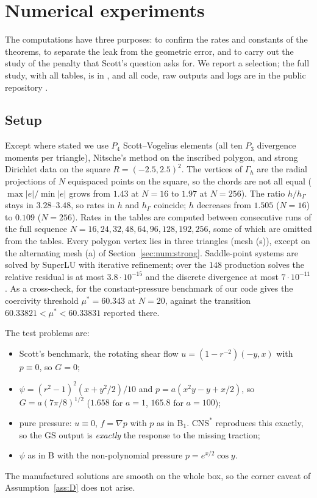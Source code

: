 \documentclass[pdflatex,sn-mathphys-num]{sn-jnl}
\theoremstyle{thmstyleone}
\theoremstyle{thmstylethree}
\newcommand{\hG}{h_\Gamma}
\newcommand{\Gh}{\Gamma_h}
\newcommand{\GS}{\mathrm{GS}}
\newcommand{\CNS}{\mathrm{CNS}^\ast}
\begin{document}
\section{Numerical experiments}\label{sec:numerics}

The computations have three purposes: to confirm the rates and constants of the theorems, to separate the leak from the geometric error, and to carry out the study of the penalty that Scott's question asks for. We report a selection; the full study, with all tables, is in \cite{PadhiExt}, and all code, raw outputs and logs are in the public repository \cite{ZeroGradRepo}.

\subsection{Setup}
Except where stated we use $P_4$ Scott--Vogelius elements (all ten $P_3$ divergence moments per triangle), Nitsche's method on the inscribed polygon, and strong Dirichlet data on the square $R=(-2.5,2.5)^2$. The vertices of $\Gh$ are the radial projections of $N$ equispaced points on the square, so the chords are not all equal ($\max|e|/\min|e|$ grows from $1.43$ at $N=16$ to $1.97$ at $N=256$). The ratio $h/\hG$ stays in $3.28$--$3.48$, so rates in $h$ and $\hG$ coincide; $h$ decreases from $1.505$ ($N=16$) to $0.109$ ($N=256$). Rates in the tables are computed between consecutive runs of the full sequence $N=16,24,32,48,64,96,128,192,256$, some of which are omitted from the tables. Every polygon vertex lies in three triangles (mesh (s)), except on the alternating mesh (a) of Section~\ref{sec:num:strong}. Saddle-point systems are solved by SuperLU \cite{SuperLU} with iterative refinement; over the $148$ production solves the relative residual is at most $3.8\cdot10^{-15}$ and the discrete divergence at most $7\cdot10^{-11}$. As a cross-check, for the constant-pressure benchmark of \cite{Cavalcante} our code gives the coercivity threshold $\mu^\ast=60.343$ at $N=20$, against the transition $60.33821<\mu^\ast<60.33831$ reported there.

The test problems are:
\begin{itemize}
\item[\textbf{A}] Scott's benchmark, the rotating shear flow $u=(1-r^{-2})(-y,x)$ with $p\equiv0$, so $G=0$;
\item[\textbf{B$_a$}] $\psi=(r^2-1)^2(x+y^2/2)/10$ and $p=a(x^2y-y+x/2)$, so $G=a(7\pi/8)^{1/2}$ ($1.658$ for $a=1$, $165.8$ for $a=100$);
\item[\textbf{P}] pure pressure: $u\equiv0$, $f=\nabla p$ with $p$ as in B$_1$. $\CNS$ reproduces this exactly, so the $\GS$ output is \emph{exactly} the response to the missing traction;
\item[\textbf{C}] $\psi$ as in B with the non-polynomial pressure $p=e^{x/2}\cos y$.
\end{itemize}
The manufactured solutions are smooth on the whole box, so the corner caveat of Assumption~\ref{ass:D} does not arise.
\end{document}
